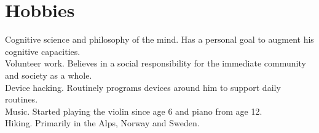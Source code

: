 \documentclass[11pt, a4paper]{article}
\newcommand{\years}[1]{\marginnote{\scriptsize #1}}
\begin{document}
\section*{Hobbies}
\years{\centering \large \textbullet}Cognitive science and philosophy of the mind. Has a personal goal to augment his cognitive capacities.\\
\years{\centering \large \textbullet}Volunteer work. Believes in a social responsibility for the immediate community and society as a whole.\\
\years{\centering \large \textbullet}Device hacking. Routinely programs devices around him to support daily routines.\\
\years{\centering \large \textbullet}Music. Started playing the violin since age 6 and piano from age 12.\\
\years{\centering \large \textbullet}Hiking. Primarily in the Alps, Norway and Sweden.
\end{document}
